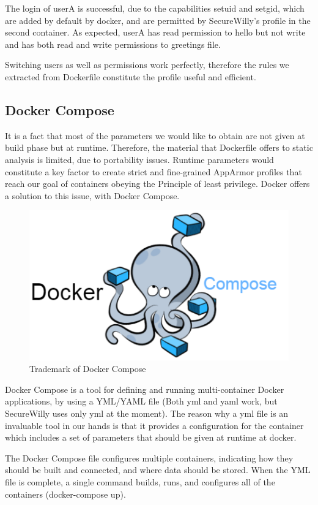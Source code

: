 The login of userA is successful, due to the capabilities setuid and setgid, which are added by default by docker, and are permitted by SecureWilly's profile in the second container. As expected, userA has read permission to hello but not write and has both read and write permissions to greetings file.

Switching users as well as permissions work perfectly, therefore the rules we extracted from Dockerfile constitute the profile useful and efficient.

\subsection{Docker Compose}
It is a fact that most of the parameters we would like to obtain are not given at build phase but at runtime. Therefore, the material that Dockerfile offers to static analysis is limited, due to portability issues. Runtime parameters would constitute a key factor to create strict and fine-grained AppArmor profiles that reach our goal of containers obeying the Principle of least privilege. Docker offers a solution to this issue, with Docker Compose.

\begin{figure}[h!]
  \centering
   \includegraphics[width=0.5\linewidth]{./figures/dockercompose.png}
   \caption{Trademark of Docker Compose}
\end{figure}

Docker Compose is a tool for defining and running multi-container Docker applications, by using a YML/YAML file (Both yml and yaml work, but SecureWilly uses only yml at the moment). The reason why a yml file is an invaluable tool in our hands is that it provides a configuration for the container which includes a set of parameters that should be given at runtime at docker.

The Docker Compose file configures multiple containers, indicating how they should be built and connected, and where data should be stored. When the YML file is complete, a single command builds, runs, and configures all of the containers (docker-compose up).

